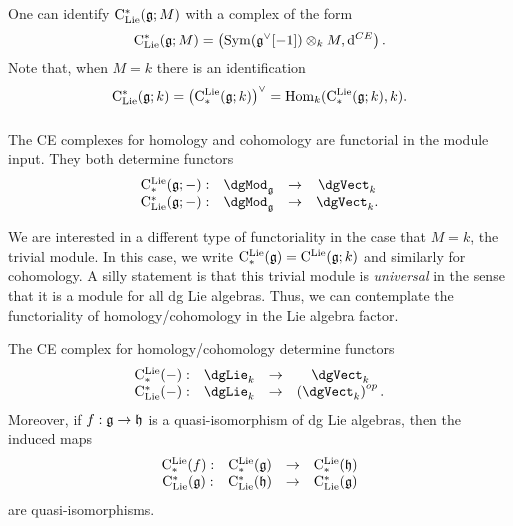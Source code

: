 \documentclass[11pt]{amsart}
\begin{document}
\begin{rmk}
One can identify ${\rm C}_{{\rm Lie}}^*(\mathfrak g ; M)$ with a complex of the form
\[
{\rm C}_{{\rm Lie}}^*(\mathfrak g ; M) = \left({\rm Sym}(\mathfrak g^\vee[-1]) \otimes_k M , {\rm d}^{CE}\right) .
\]
Note that, when $M = k$ there is an identification 
\[
{\rm C}_{{\rm Lie}}^*(\mathfrak g ; k) = \left({\rm C}^{\rm Lie}_*(\mathfrak g ; k)\right)^\vee = {\rm Hom}_k({\rm C}^{\rm Lie}_*(\mathfrak g ;k), k) .
\] 
\end{rmk}

\subsubsection{}

The CE complexes for homology and cohomology are functorial in the module input.
They both determine functors
\[
\begin{array}{cccc}
\clieu_*(\fg ; -) : & \dgMod_\fg & \to & \dgVect_k\\
\clie^*(\fg ; -) : & \dgMod_{\fg} & \to & \dgVect_k .
\end{array}
\]

We are interested in a different type of functoriality in the case that $M = k$, the trivial module. 
In this case, we write ${\rm C}^{\rm Lie}_*(\mathfrak g) = {\rm C}^{\rm Lie}(\mathfrak g;k)$ and similarly for cohomology.
A silly statement is that this trivial module is {\em universal} in the sense that it is a module for all dg Lie algebras.
Thus, we can contemplate the functoriality of homology/cohomology in the Lie algebra factor. 

\begin{lem}
The CE complex for homology/cohomology determine functors
\[
\begin{array}{cccc}
\clieu_*(-) : & \dgLie_k & \to & \dgVect_k\\
\clie^*(-) : & \dgLie_k & \to & \left(\dgVect_k\right)^{op} .
\end{array}
\]
Moreover, if $f : \mathfrak g \to \mathfrak h$ is a quasi-isomorphism of dg Lie algebras, then the induced maps
\[
\begin{array}{cccc}
{\rm C}^{\rm Lie}_*(f) : & {\rm C}^{\rm Lie}_*(\mathfrak g) & \to & {\rm C}^{\rm Lie}_*(\mathfrak h)\\
{\rm C}_{{\rm Lie}}^*(\mathfrak g) : & {\rm C}_{{\rm Lie}}^*(\mathfrak h) & \to & {\rm C}_{{\rm Lie}}^*(\mathfrak g) 
\end{array}
\]
are quasi-isomorphisms. 
\end{lem}
\end{document}
